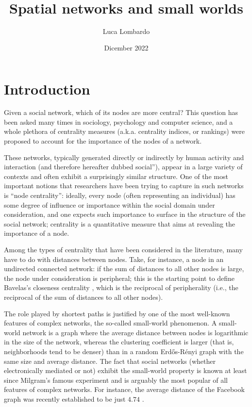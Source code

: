\documentclass[12pt]{article}
\title{Spatial networks and small worlds}
\author{Luca Lombardo}
\date{Dicember 2022}
\newcommand{\s}{\vspace*{0.4cm}}
\newcommand{\nd}{\noindent}
\begin{document}
\maketitle

\begin{abstract}
    \noindent \lipsum[1]
\end{abstract}

\tableofcontents
\clearpage

\section{Introduction}
Given a social network, which of its nodes are more central? This question has been asked many times in sociology, psychology and computer science, and a whole plethora of centrality measures (a.k.a. centrality indices, or rankings) were proposed to account for the importance of the nodes of a network. \s

\nd These networks, typically generated directly or indirectly by human activity and interaction (and therefore hereafter dubbed social”), appear in a large variety of contexts and often exhibit a surprisingly similar structure. One of the most important notions that researchers have been trying to capture in such networks is “node centrality”: ideally, every node (often representing an individual) has some degree of influence or importance within the social domain under  consideration, and one expects such importance to surface in the structure of the social network; centrality is a quantitative measure that aims at revealing the importance of a node. \s

\nd Among the types of centrality that have been considered in the literature, many have to do with distances between nodes. Take, for instance, a node in an undirected connected network: if the sum of distances to all other nodes is large, the node under consideration is peripheral; this is the starting point to define Bavelas's closeness centrality \cite{closeness}, which is the reciprocal of peripherality (i.e., the reciprocal of the sum of distances to all other nodes). \s

\nd The role played by shortest paths is justified by one of the most well-known features of complex networks, the so-called small-world phenomenon. A small-world network \cite{cohen_havlin_2010} is a graph where the average distance between nodes is logarithmic in the size of the network, whereas the clustering coefficient is larger (that is, neighborhoods tend to be denser) than in a random Erdős-Rényi graph with the same size and average distance. The fact that social networks (whether electronically mediated or not) exhibit the small-world property is known at least since Milgram's famous experiment \cite{} and is arguably the most popular of all features of complex networks. For instance, the average distance of the Facebook graph was recently established to be just $4.74$ \cite{milgram1967small}. \s
\end{document}
